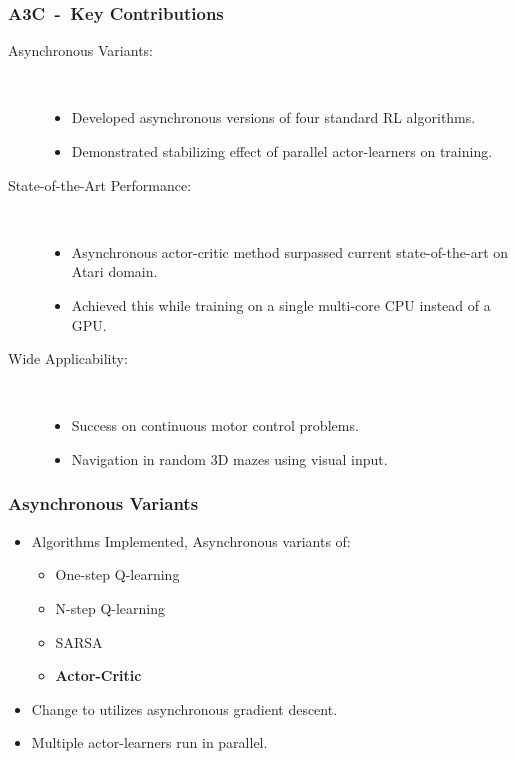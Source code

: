 \documentclass{beamer}
\begin{document}
\begin{frame}
    \frametitle{A3C~-~Key Contributions}
    \begin{description}
        \item[Asynchronous Variants:] \phantom{}\\
            \begin{itemize}
                \item Developed asynchronous versions of four standard RL algorithms.
                \item Demonstrated stabilizing effect of parallel actor-learners on training.
            \end{itemize}
        \item[State-of-the-Art Performance:] \phantom{}\\
            \begin{itemize}
                \item Asynchronous actor-critic method surpassed current 
                state-of-the-art on Atari domain.
                \item Achieved this while training on a single multi-core CPU 
                instead of a GPU.%
            \end{itemize}
        \item[Wide Applicability:] \phantom{}\\
            \begin{itemize}
                \item Success on continuous motor control problems.
                \item Navigation in random 3D mazes using visual input.
            \end{itemize}
    \end{description}
\end{frame}

\begin{frame}
    \frametitle{Asynchronous Variants}
    \begin{itemize}
        \item Algorithms Implemented,
        Asynchronous variants of:
        \begin{itemize}
            \item One-step Q-learning
            \item N-step Q-learning
            \item SARSA
            \item \textbf{Actor-Critic}
        \end{itemize} 
        \item Change to utilizes asynchronous gradient descent.
        \item Multiple actor-learners run in parallel.
    \end{itemize}
\end{frame}
\end{document}
